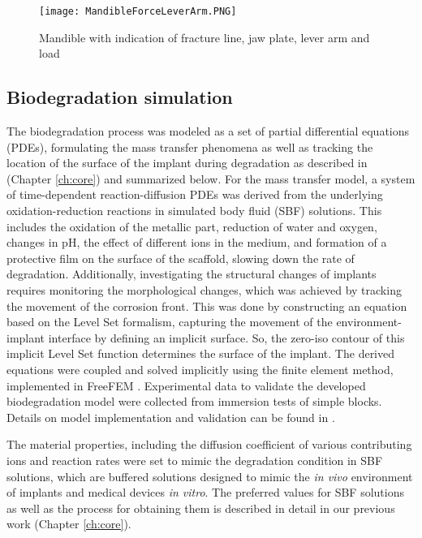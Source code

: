 \begin{figure}[h]
    \centering
    \medskip
    \texttt{[image: MandibleForceLeverArm.PNG]}
    \caption{Mandible with indication of fracture line, jaw plate, lever arm and load}
    \label{fig:MandibleForceLeverArm}
\end{figure}


\subsection{Biodegradation simulation}
\label{sec:biodeg}

The biodegradation process was modeled as a set of partial differential equations ({PDE}s), formulating the mass transfer phenomena as well as tracking the location of the surface of the implant during degradation as described in \cite{Barzegari2021} (Chapter \ref{ch:core}) and summarized below. For the mass transfer model, a system of time-dependent reaction-diffusion {PDE}s was derived from the underlying oxidation-reduction reactions in simulated body fluid ({SBF}) solutions. This includes the oxidation of the metallic part, reduction of water and oxygen, changes in pH, the effect of different ions in the medium, and formation of a protective film on the surface of the scaffold, slowing down the rate of degradation. Additionally, investigating the structural changes of implants requires monitoring the morphological changes, which was achieved by tracking the movement of the corrosion front. This was done by constructing an equation based on the Level Set formalism, capturing the movement of the environment-implant interface by defining an implicit surface. So, the zero-iso contour of this implicit Level Set function determines the surface of the implant. The derived equations were coupled and solved implicitly using the finite element method, implemented in FreeFEM \cite{Hecht2012}. Experimental data to validate the developed biodegradation model were collected from immersion tests of simple blocks. Details on model implementation and validation can be found in \cite{Barzegari2021}.

The material properties, including the diffusion coefficient of various contributing ions and reaction rates were set to mimic the degradation condition in {SBF} solutions, which are buffered solutions designed to mimic the \textit{in vivo} environment of implants and medical devices \textit{in vitro}. The preferred values for {SBF} solutions as well as the process for obtaining them is described in detail in our previous work \cite{Barzegari2021} (Chapter \ref{ch:core}).

